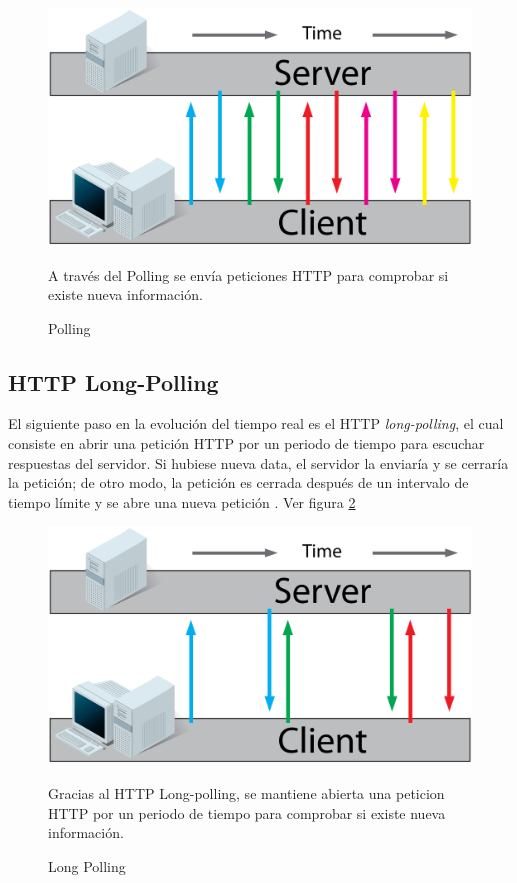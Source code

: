 \begin{figure}[!h]
  \centering
  \includegraphics[scale=0.6]{figuras/ajax_polling.png}\\
  \caption{Polling}{A través del Polling se envía peticiones HTTP para comprobar si existe nueva información.}\label{fig:polling}
\end{figure}

\subsection{HTTP Long-Polling}
El siguiente paso en la evolución del tiempo real es el HTTP \emph{long-polling}, el cual consiste en abrir una petición HTTP por un periodo de tiempo para escuchar respuestas del servidor. Si hubiese nueva data, el servidor la enviaría y se cerraría la petición; de otro modo, la petición es cerrada después de un intervalo de tiempo límite y se abre una nueva petición \cite{lengstorf_realtime_2013}.  Ver figura \ref{fig:http_long_polling}
\begin{figure}[h]
  \centering
  \includegraphics[scale=0.6]{figuras/ajax_long_polling.png}\\
  \caption{Long Polling}{Gracias al HTTP Long-polling, se mantiene abierta una peticion HTTP por un periodo de tiempo para comprobar si existe nueva información.}\label{fig:http_long_polling}
\end{figure}

